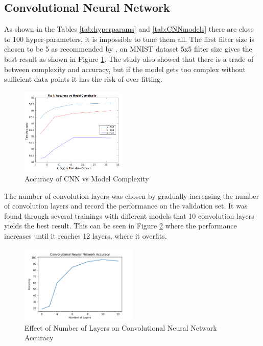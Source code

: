 \documentclass[letterpaper, 10 pt, conference]{ieeeconf}  %
\begin{document}
\subsection{Convolutional Neural Network}
As shown in the Tables \ref{tab:hyperparams} and \ref{tab:CNNmodels} there are close to 100 hyper-parameters, it is impossible to tune them all. The first filter size is chosen to be 5 as recommended by \cite{dhingra2017model}, on MNIST dataset 5x5 filter size gives the best result as shown in Figure \ref{fig:cnnComplexity}. The study also showed that there is a trade of between complexity and accuracy, but if the model gets too complex without sufficient data points it has the risk of over-fitting. 
\begin{figure}
	\begin{center}
		\includegraphics[width=0.45\textwidth]{figures/cnncomplexity.png}  %
		\caption{Accuracy of CNN vs Model Complexity \cite[p.~4]{dhingra2017model}}
		\label{fig:cnnComplexity}
	\end{center}
\end{figure}
The number of convolution layers was chosen by gradually increasing the number of convolution layers and record the performance on the validation set. It was found through several trainings with different models that 10 convolution layers yields the best result. This can be seen in Figure \ref{fig:cnnAccuvsLayers} where the performance increases until it reaches 12 layers, where it overfits. 
\begin{figure}
	\begin{center}
		\includegraphics[width=0.5\textwidth]{figures/CNNaccuvsLayers.pdf}  %
		\caption{Effect of Number of Layers on Convolutional Neural Network Accuracy}
		\label{fig:cnnAccuvsLayers}
	\end{center}
\end{figure}
\end{document}
